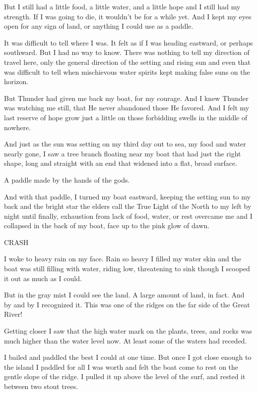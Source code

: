 But I still had a little food, a little water, and a little hope and I still had my strength. If I was going to die, it wouldn't be for a while yet. And I kept my eyes open for any sign of land, or anything I could use as a paddle.

It was difficult to tell where I was. It felt as if I was heading eastward, or perhaps southward. But I had no way to know. There was nothing to tell my direction of travel here, only the general direction of the setting and rising sun and even that was difficult to tell when mischievous water spirits kept making false suns on the horizon.

But Thunder had given me back my boat, for my courage. And I knew Thunder was watching me still, that He never abandoned those He favored. And I felt my last reserve of hope grow just a little on those forbidding swells in the middle of nowhere.

And just as the sun was setting on my third day out to sea, my food and water nearly gone, I saw a tree branch floating near my boat that had just the right shape, long and straight with an end that widened into a flat, broad surface.

A paddle made by the hands of the gods.

And with that paddle, I turned my boat eastward, keeping the setting sun to my back and the bright star the elders call the True Light of the North to my left by night until finally, exhaustion from lack of food, water, or rest overcame me and I collapsed in the back of my boat, face up to the pink glow of dawn.

CRASH

I woke to heavy rain on my face. Rain so heavy I filled my water skin and the boat was still filling with water, riding low, threatening to sink though I scooped it out as much as I could.

But in the gray mist I could see the land. A large amount of land, in fact. And by and by I recognized it. This was one of the ridges on the far side of the Great River!

Getting closer I saw that the high water mark on the plants, trees, and rocks was much higher than the water level now. At least some of the waters had receded.

I bailed and paddled the best I could at one time. But once I got close enough to the island I paddled for all I was worth and felt the boat come to rest on the gentle slope of the ridge. I pulled it up above the level of the surf, and rested it between two stout trees.

